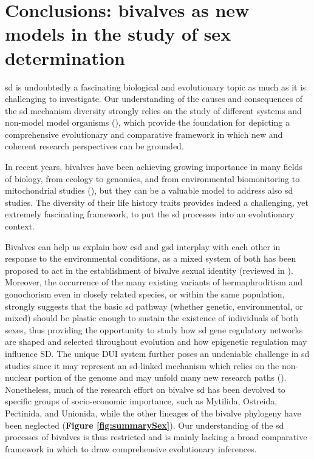 \documentclass[../main.tex]{subfiles}
\begin{document}
\section{Conclusions: bivalves as new models in the study of sex determination}
\gls{sd} is undoubtedly a fascinating biological and evolutionary topic as much as it is challenging to investigate. Our understanding of the causes and consequences of the \gls{sd} mechanism diversity strongly relies on the study of different systems and non-model model organisms (\textbf{\cite{bachtrog2014sex,milani2020faraway}}), which provide the foundation for depicting a comprehensive evolutionary and comparative framework in which new and coherent research perspectives can be grounded.

In recent years, bivalves have been achieving growing importance in many fields of biology, from ecology to genomics, and from environmental biomonitoring to mitochondrial studies (\textbf{\cite{milani2020faraway,ghiselli2021bivalve}}), but they can be a valuable model to address also \gls{sd} studies. The diversity of their life history traits provides indeed a challenging, yet extremely fascinating framework, to put the \gls{sd} processes into an evolutionary context.

Bivalves can help us explain how \gls{esd} and \gls{gsd} interplay with each other in response to the environmental conditions, as a mixed system of both has been proposed to act in the establishment of bivalve sexual identity (reviewed in \textbf{\cite{breton2018sex}}). Moreover, the occurrence of the many existing variants of hermaphroditism and gonochorism even in closely related species, or within the same population, strongly suggests that the basic \gls{sd} pathway (whether genetic, environmental, or mixed) should be plastic enough to sustain the existence of individuals of both sexes, thus providing the opportunity to study how \gls{sd} gene regulatory networks are shaped and selected throughout evolution and how epigenetic regulation may influence SD. The unique DUI system further poses an undeniable challenge in \gls{sd} studies since it may represent an \gls{sd}-linked mechanism which relies on the non-nuclear portion of the genome and may unfold many new research paths (\textbf{\cite{milani2020faraway,ghiselli2021bivalve}}). Nonetheless, much of the research effort on bivalve \gls{sd} has been devolved to specific groups of socio-economic importance, such as Mytilida, Ostreida, Pectinida, and Unionida, while the other lineages of the bivalve phylogeny have been neglected (\textbf{Figure \ref{fig:summarySex}}). Our understanding of the \gls{sd} processes of bivalves is thus restricted and is mainly lacking a broad comparative framework in which to draw comprehensive evolutionary inferences. 
\end{document}
